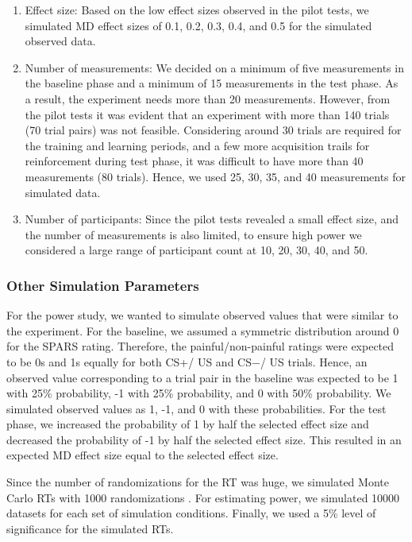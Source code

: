\documentclass{jote-article}
\begin{document}
  \begin{enumerate}

  \item Effect size: Based on the low effect sizes observed in the pilot tests, we simulated MD effect sizes of 0.1, 0.2, 0.3, 0.4, and 0.5 for the simulated observed data.


  \item Number of measurements: We decided on a minimum of five measurements in the baseline phase and a minimum of 15 measurements in the test phase. As a result, the experiment needs more than 20 measurements. However, from the pilot tests it was evident that an experiment with more than 140 trials (70 trial pairs) was not feasible. Considering around 30 trials are required for the training and learning periods, and a few more acquisition trails for reinforcement during test phase, it was difficult to have more than 40 measurements (80 trials). Hence, we used 25, 30, 35, and 40 measurements for simulated data.


  \item Number of participants: Since the pilot tests revealed a small effect size, and the number of measurements is also limited, to ensure high power we considered a large range of participant count at 10, 20, 30, 40, and 50.


  

\end{enumerate}
\subsubsection{Other Simulation Parameters}

For the power study, we wanted to simulate observed values that were similar to the experiment. For the baseline, we assumed a symmetric distribution around 0 for the SPARS rating. Therefore, the painful/non-painful ratings were expected to be 0s and 1s equally for both CS+/ US and CS−/ US trials. Hence, an observed value corresponding to a trial pair in the baseline was expected to be 1 with 25\% probability, -1 with 25\% probability, and 0 with 50\% probability. We simulated observed values as 1, -1, and 0 with these probabilities. For the test phase, we increased the probability of 1 by half the selected effect size and decreased the probability of -1 by half the selected effect size. This resulted in an expected MD effect size equal to the selected effect size.

Since the number of randomizations for the RT was huge, we simulated Monte Carlo RTs with 1000 randomizations \cite{bibr49}. For estimating power, we simulated 10000 datasets for each set of simulation conditions. Finally, we used a 5\% level of significance for the simulated RTs.
\end{document}
